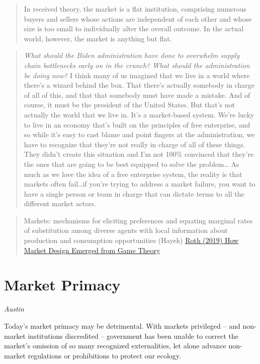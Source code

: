 \documentclass[
]{book}
\begin{document}
\begin{quote}
In received theory, the market is a flat institution, comprising
numerous buyers and sellers whose actions are independent of each other and whose size is
too small to individually alter the overall outcome.
In the actual world, however, the market is anything but flat.
\end{quote}

\begin{quote}
\emph{What should the Biden administration have done to overwhelm supply chain bottlenecks early on in the crunch? What should the administration be doing now?}
I think many of us imagined that we live in a world where there's a wizard behind the box. That there's actually somebody in charge of all of this, and that that somebody must have made a mistake. And of course, it must be the president of the United States. But that's not actually the world that we live in. It's a market-based system. We're lucky to live in an economy that's built on the principles of free enterprise, and so while it's easy to cast blame and point fingers at the administration, we have to recognize that they're not really in charge of all of these things. They didn't create this situation and I'm not 100\% convinced that they're the ones that are going to be best equipped to solve the problem\ldots{}
As much as we love the idea of a free enterprise system, the reality is that markets often fail\ldots if you're trying to address a market failure, you want to have a single person or team in charge that can dictate terms to all the different market actors.
\end{quote}

\begin{quote}
Markets: mechanisms for eliciting preferences and equating marginal rates of substitution
among diverse agents with local information about production and consumption
opportunities (Hayek) \href{https://www.aeaweb.org/articles?id=10.1257/jep.33.3.118}{Roth (2019) How Market Design Emerged from Game Theory}
\end{quote}

\hypertarget{market-primacy-1}{%
\section{Market Primacy}\label{market-primacy-1}}

\emph{Austin}

Today's market primacy may be detrimental. With markets privileged -- and non-market institutions discredited -- government has been unable to correct the market's omission of so many recognized externalities, let alone advance non-market regulations or prohibitions to protect our ecology.
\end{document}
